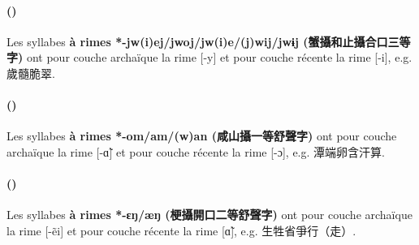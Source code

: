 \documentclass{scrbook}
\newcounter{c}[subsubsection]
\newcommand{\stpc}[1]{\stepcounter{#1}}
\newcommand{\termyyx}[1]{\textbf{#1}}
\begin{document}
\begin{sloppypar}
\stpc{c}\paragraph{()}
Les syllabes \termyyx{à rimes *-jw(i)ej/jwoj/jw(i)e/(j)wij/jwɨj (蟹攝和止攝合口三等字)} ont pour couche archaïque la rime [-y] et pour couche récente la rime [-i], e.g. 歲髓脆翠.

\stpc{c}\paragraph{()}
Les syllabes \termyyx{à rimes *-om/am/(w)an (咸山攝一等舒聲字)} ont pour couche archaïque la rime [-ɑ̃] et pour couche récente la rime [-ɔ], e.g. 潭端卵含汗算.

\stpc{c}\paragraph{()}
Les syllabes \termyyx{à rimes *-ɛŋ/æŋ (梗攝開口二等舒聲字)} ont pour couche archaïque la rime [-ẽi] et pour couche récente la rime [ɑ̃], e.g. 生牲省爭行（走）.


\end{sloppypar}
\end{document}
